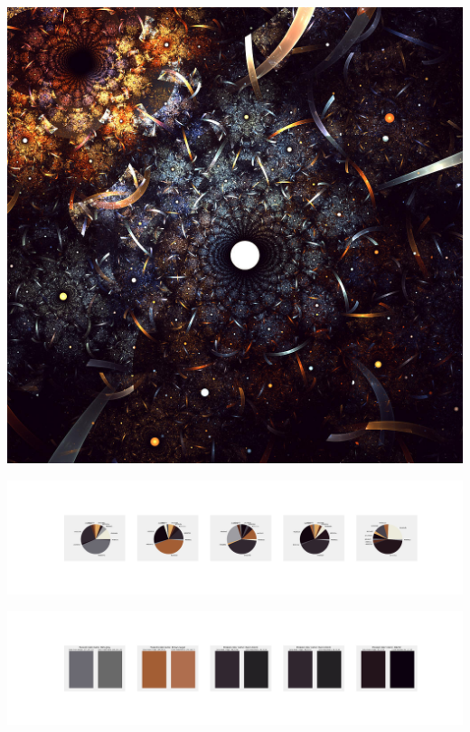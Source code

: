 \documentclass[11pt]{article}
\begin{document}
\begin{landscape}
    \begin{center}
    \includegraphics[width=\textwidth]{./nbimg/file (251).jpg}
    \end{center}

    \begin{center}
    \includegraphics[width=250mm]{./nbimg/pie-169.jpg}
    \end{center}

    \begin{center}
    \includegraphics[width=250mm]{./nbimg/peak-169.jpg}
    \end{center}
    


\end{landscape}
\end{document}
